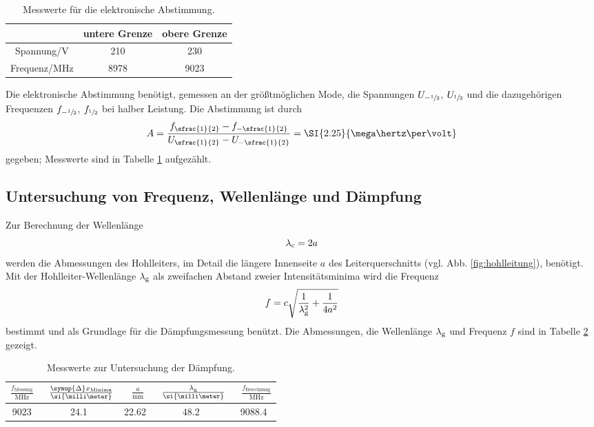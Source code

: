 %
\begin{table}
\centering
\caption{Messwerte für die elektronische Abstimmung.}
\begin{tabular}{c cc}
	\toprule
	&{untere Grenze} &{obere Grenze}\\
	\midrule
		{Spannung/$\si{\volt}$} &210 &230 \\
		{Frequenz/$\si{\mega\hertz}$} &8978 &9023\\
	\bottomrule
\end{tabular}
\label{tab:elktr_abstimmung}
\end{table}
%
Die elektronische Abstimmung benötigt, gemessen an der größtmöglichen Mode, die Spannungen $U_{-\sfrac{1}{2}}$, $U_{\sfrac{1}{2}}$ und die dazugehörigen Frequenzen $f_{-\sfrac{1}{2}}$, $f_{\sfrac{1}{2}}$ bei halber Leistung.
Die Abstimmung ist durch
\begin{equation}
	A=\frac{f_{\sfrac{1}{2}}-f_{-\sfrac{1}{2}}}{U_{\sfrac{1}{2}}-U_{-\sfrac{1}{2}}} = \SI{2.25}{\mega\hertz\per\volt}
\end{equation}
gegeben;
Messwerte sind in Tabelle \ref{tab:elktr_abstimmung} aufgezählt.

\subsection{Untersuchung von Frequenz, Wellenlänge und Dämpfung}
Zur Berechnung der Wellenlänge 
\begin{equation}
	\lambda_\text c = 2a
\end{equation} 
werden die Abmessungen des Hohlleiters, im Detail die längere Innenseite $a$ des Leiterquerschnitts (vgl. Abb. \ref{fig:hohlleitung}), benötigt. 
Mit der Hohlleiter-Wellenlänge $\lambda_\text g$ als zweifachen Abstand zweier Intensitätsminima wird die Frequenz 
\begin{equation}
	f=c\sqrt{\frac{1}{\lambda^2_\text g}+\frac{1}{4a^2}}
\end{equation}
bestimmt und als Grundlage für die Dämpfungsmessung benützt.
Die Abmessungen, die Wellenlänge $\lambda_\text g$ und Frequenz $f$ sind in Tabelle \ref{tab:flambdagamma}
gezeigt. 
\begin{table}
\centering
\caption{Messwerte zur Untersuchung der Dämpfung.}
\begin{tabular}{ccccc}
	\toprule
	$\frac{f_\text{Messung}}{\si{\mega\hertz}}$& \
	$\frac{\symup{\Delta}x_\text{Minima}}{\si{\milli\meter}}$& \
	$\frac{a}{\si{\milli\meter}}$& \
	$\frac{\lambda_\text g}{\si{\milli\meter}}$& \
	$\frac{f_\text{Berechnung}}{\si{\mega\hertz}}$\\
	\midrule
		9023&	24.1&	22.62&	48.2&	9088.4\\
	\bottomrule
\end{tabular}
\label{tab:flambdagamma}
\end{table}

